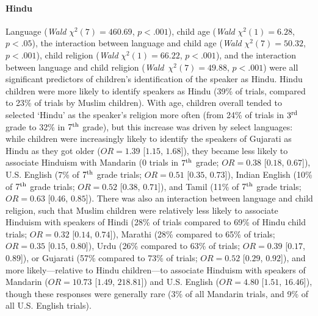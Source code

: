 \documentclass{foushee-adapted-preprint}
\begin{document}
\paragraph*{Hindu} %
Language (\textit{Wald} $\chi^2(7)=460.69$, $p<.001$), child age (\textit{Wald} $\chi^2(1)=6.28$, $p<.05$), the interaction between language and child age (\textit{Wald} $\chi^2(7)=50.32$, $p<.001$), child religion (\textit{Wald} $\chi^2(1)=66.22$, $p<.001$), and the interaction between language and child religion (\textit{Wald}~$\chi^2(7)=49.88$, $p<.001$) were all significant predictors of children's identification of the speaker as Hindu. %
Hindu children were more likely to identify speakers as Hindu (39\% of trials, compared to 23\% of trials by Muslim children). 
With age, children overall tended to selected `Hindu' as the speaker's religion more often (from 24\% of trials in $3^{\textnormal{rd}}$ grade to 32\% in $7^{\textnormal{th}}$ grade), but this increase was driven by select languages: while children were increasingly likely to identify the speakers of Gujarati as Hindu as they got older ($OR=1.39$ [$1.15$, $1.68$]), they became less likely to associate Hinduism with Mandarin (0 trials in $7^{\textnormal{th}}$ grade; 
$OR=0.38$ [$0.18$, $0.67$]), U.S. English (7\% of $7^{\textnormal{th}}$ grade trials; 
$OR=0.51$ [$0.35$, $0.73$]), Indian English (10\% of $7^{\textnormal{th}}$ grade trials; 
$OR=0.52$ [$0.38$, $0.71$]), and Tamil (11\% of $7^{\textnormal{th}}$ grade trials; 
$OR=0.63$ [$0.46$, $0.85$]). 
There was also an interaction between language and child religion, such that Muslim children were relatively less likely to associate Hinduism with speakers of Hindi (28\% of trials compared to 69\% of Hindu child trials; $OR=0.32$ [$0.14$, $0.74$]), 
Marathi (28\% compared to 65\% of trials; $OR=0.35$ [$0.15$, $0.80$]), Urdu (26\% compared to 63\% of trials; $OR=0.39$ [$0.17$, $0.89$]), or Gujarati (57\% compared to 73\% of trials; $OR=0.52$ [$0.29$, $0.92$]), and more likely---relative to Hindu children---to associate Hinduism with speakers of Mandarin ($OR=10.73$ [$1.49$, $218.81$]) and U.S. English ($OR=4.80$ [$1.51$, $16.46$]), though these responses were generally rare (3\% of all Mandarin trials, and 9\% of all U.S. English trials).
\end{document}
